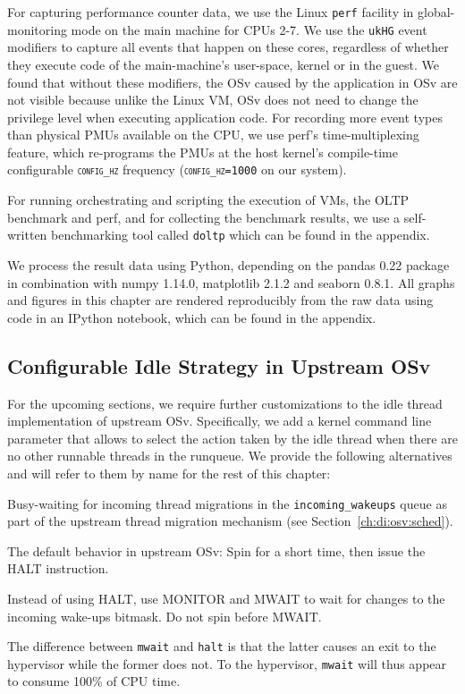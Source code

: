 \documentclass[12pt,a4paper]{book}
\begin{document}
For capturing performance counter data, we use the Linux \texttt{perf} facility in global-monitoring mode on the main machine for CPUs 2-7.
We use the \texttt{ukHG} event modifiers to capture all events that happen on these cores, regardless of whether they execute code of the main-machine's user-space, kernel or in the guest.
We found that without these modifiers, the OSv caused by the application in OSv are not visible because unlike the Linux VM, OSv does not need to change the privilege level when executing application code.
For recording more event types than physical PMUs available on the CPU, we use perf's time-multiplexing feature, which re-programs the PMUs at the host kernel's compile-time configurable \textsc{\texttt{config\_hz}} frequency (\textsc{\texttt{config\_hz=1000}} on our system).~\cite{perfTimeMultiplexing}

For running orchestrating and scripting the execution of VMs, the OLTP benchmark and perf, and for collecting the benchmark results, we use a self-written benchmarking tool called \texttt{doltp} which can be found in the appendix.

We process the result data using Python, depending on the pandas 0.22 package in combination with numpy 1.14.0, matplotlib 2.1.2 and seaborn 0.8.1.
All graphs and figures in this chapter are rendered reproducibly from the raw data using code in an IPython notebook, which can be found in the appendix.

\subsection{Configurable Idle Strategy in Upstream OSv}\label{ch:eval:setup:idle}

For the upcoming sections, we require further customizations to the idle thread implementation of upstream OSv.
Specifically, we add a kernel command line parameter that allows to select the action taken by the idle thread when there are no other runnable threads in the runqueue.
We provide the following alternatives and will refer to them by name for the rest of this chapter:
\begin{description}[labelwidth=3em,leftmargin=3.5em]
    \item[\texttt{busy}] Busy-waiting for incoming thread migrations in the \lstinline[style=figurecpp]{incoming_wakeups} queue as part of the upstream thread migration mechanism (see Section~\ref{ch:di:osv:sched}).
    \item[\texttt{halt}] The default behavior in upstream OSv: Spin for a short time, then issue the HALT instruction.
    \item[\texttt{mwait}] Instead of using HALT, use MONITOR and MWAIT to wait for changes to the incoming wake-ups bitmask. Do not spin before MWAIT.
\end{description}
The difference between \texttt{mwait} and \texttt{halt} is that the latter causes an exit to the hypervisor while the former does not.
To the hypervisor, \texttt{mwait} will thus appear to consume 100\% of CPU time.
\end{document}
